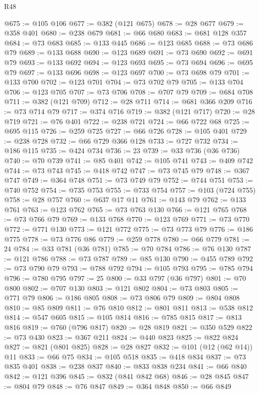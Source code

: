 \begin{lexlean}{R48}
\begin{coremodule}
@675 := @105 @106
@677 := @382 (@121 @675)
@678 := @28 @677
@679 := @358 @401
@680 := @238 @679
@681 := @66 @680
@683 := @681 @128 @357
@684 := @73 @683
@685 := @133 @445
@686 := @123 @685
@688 := @73 @686 @79
@689 := @133 @688
@690 := @123 @689
@691 := @73 @690
@692 := @691 @79
@693 := @133 @692
@694 := @123 @693
@695 := @73 @694
@696 := @695 @79
@697 := @133 @696
@698 := @123 @697
@700 := @73 @698 @79
@701 := @133 @700
@702 := @123 @701
@704 := @73 @702 @79
@705 := @133 @704
@706 := @123 @705
@707 := @73 @706
@708 := @707 @79
@709 := @684 @708
@711 := @382 (@121 @709)
@712 := @28 @711
@714 := @681 @366 @209
@716 := @73 @714 @79
@717 := @374 @716
@719 := @382 (@121 @717)
@720 := @28 @719
@721 := @76 @401
@722 := @238 @721
@724 := @66 @722 @68
@725 := @695 @115
@726 := @259 @725
@727 := @66 @726
@728 := @105 @401
@729 := @238 @728
@732 := @66 @729 @366 @128
@733 := @727 @732
@734 := @186 @115
@735 := @424 @734
@736 := 23
@739 := @33 @736 (@36 @736)
@740 := @70 @739
@741 := @85 @401
@742 := @105 @741
@743 := @409 @742
@744 := @73 @743
@745 := @418 @742
@747 := @73 @745 @79
@748 := @367 @747
@749 := @364 @748
@751 := @73 @749 @79
@752 := @744 @751
@753 := @740 @752
@754 := @735 @753
@755 := @733 @754
@757 := @103 (@724 @755)
@758 := @28 @757
@760 := @637 @17 @11
@761 := @143 @79
@762 := @133 @761
@763 := @123 @762
@765 := @73 @763 @130
@766 := @121 @765
@768 := @73 @766 @79
@769 := @133 @768
@770 := @123 @769
@771 := @73 @770
@772 := @771 @130
@773 := @121 @772
@775 := @73 @773 @79
@776 := @186 @775
@778 := @73 @776 @86
@779 := @259 @778
@780 := @66 @779
@781 := 24
@784 := @33 @781 (@36 @781)
@785 := @70 @784
@786 := @76 @130
@787 := @121 @786
@788 := @73 @787
@789 := @85 @130
@790 := @455 @789
@792 := @73 @790 @79
@793 := @788 @792
@794 := @105 @793
@795 := @785 @794
@796 := @780 @795
@797 := 25
@800 := @33 @797 (@36 @797)
@801 := @70 @800
@802 := @707 @130
@803 := @121 @802
@804 := @73 @803
@805 := @771 @79
@806 := @186 @805
@808 := @73 @806 @79
@809 := @804 @808
@810 := @85 @809
@811 := @76 @810
@812 := @801 @811
@813 := @538 @812
@814 := @547 @605
@815 := @105 @814
@816 := @785 @815
@817 := @813 @816
@819 := @760 (@796 @817)
@820 := @28 @819
@821 := @350 @529
@822 := @73 @430
@823 := @367 @211
@824 := @440 @823
@825 := @822 @824
@827 := @821 (@801 @825)
@828 := @28 @827
@832 := @101 (@12 (@62 @14)) @11
@833 := @66 @75
@834 := @105 @518
@835 := @418 @834
@837 := @73 @835 @401
@838 := @238 @837
@840 := @833 @838 @234
@841 := @66 @840
@842 := @121 @396
@845 := @832 (@841 @842 @68)
@846 := @28 @845
@847 := @804 @79
@848 := @76 @847
@849 := @364 @848
@850 := @66 @849

\end{coremodule}
\end{lexlean}
